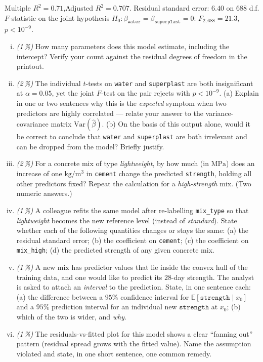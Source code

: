 \documentclass[11pt,a4paper]{article}
\newcommand{\subpoints}[1]{\textit{(#1\,\%)}}
\begin{document}
\noindent Multiple $R^2 = 0.71$,\quad Adjusted $R^2 = 0.707$. Residual standard error: $6.40$ on $688$ d.f.
$F$-statistic on the joint hypothesis $H_0:\beta_{\texttt{water}}=\beta_{\texttt{superplast}}=0$: $F_{2,688}=21.3$, $p<10^{-9}$.

\begin{enumerate}[(i)]
  \item \subpoints{1} How many parameters does this model estimate, including the intercept? Verify your count against the residual degrees of freedom in the printout.
  \item \subpoints{2} The individual $t$-tests on \texttt{water} and \texttt{superplast} are both insignificant at $\alpha=0.05$, yet the joint $F$-test on the pair rejects with $p<10^{-9}$. (a) Explain in one or two sentences why this is the \emph{expected} symptom when two predictors are highly correlated --- relate your answer to the variance-covariance matrix $\mathrm{Var}(\hat\beta)$. (b) On the basis of this output alone, would it be correct to conclude that \texttt{water} and \texttt{superplast} are both irrelevant and can be dropped from the model? Briefly justify.
  \item \subpoints{2} For a concrete mix of type \emph{lightweight}, by how much (in $\mathrm{MPa}$) does an increase of one $\mathrm{kg/m^3}$ in \texttt{cement} change the predicted \texttt{strength}, holding all other predictors fixed? Repeat the calculation for a \emph{high-strength} mix. (Two numeric answers.)
  \item \subpoints{1} A colleague refits the same model after re-labelling \texttt{mix\_type} so that \emph{lightweight} becomes the new reference level (instead of \emph{standard}). State whether each of the following quantities changes or stays the same: (a) the residual standard error; (b) the coefficient on \texttt{cement}; (c) the coefficient on \texttt{mix\_high}; (d) the predicted strength of any given concrete mix.
  \item \subpoints{1} A new mix has predictor values that lie inside the convex hull of the training data, and one would like to predict its $28$-day strength. The analyst is asked to attach an \emph{interval} to the prediction. State, in one sentence each: (a) the difference between a $95\%$ confidence interval for $\mathbb{E}[\texttt{strength}\mid x_0]$ and a $95\%$ prediction interval for an individual new $\texttt{strength}$ at $x_0$; (b) which of the two is wider, and \emph{why}.
  \item \subpoints{1} The residuals-vs-fitted plot for this model shows a clear ``fanning out'' pattern (residual spread grows with the fitted value). Name the assumption violated and state, in one short sentence, one common remedy.
\end{enumerate}
\end{document}
